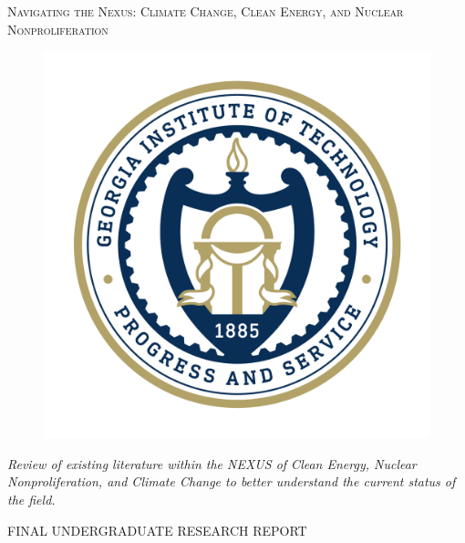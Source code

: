 \documentclass[11,5 pt]{article}
\begin{document}
\begin{titlepage}

\centering

{\scshape\LARGE Navigating the Nexus: Climate Change, Clean Energy, and Nuclear Nonproliferation \par}
\begin{figure}[ht!]
\centering
\vspace{0.5 cm}
\includegraphics[scale=0.25]{images/gt-seal_0.png}
\end{figure}
\vspace{0.39 cm}

\centering

{\itshape\LARGE Review of existing literature within the NEXUS of Clean Energy, Nuclear Nonproliferation, and Climate Change to better understand the current status of the field.
 \par}
\vspace{1.3cm}
{\scshape\LARGE  FINAL UNDERGRADUATE RESEARCH REPORT\par}
\vspace{0.2 cm}


\end{titlepage}
\end{document}
